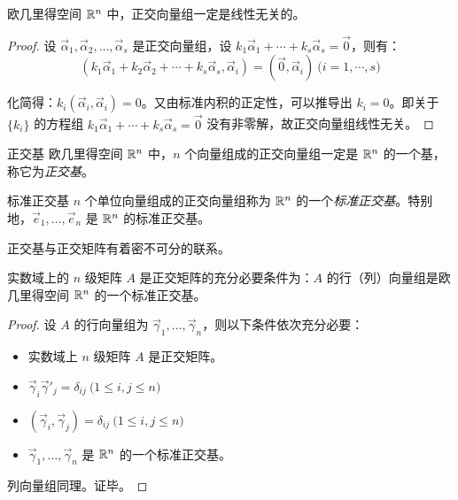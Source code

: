 \begin{theorem}
	欧几里得空间 $\mathbb R^n$ 中，正交向量组一定是线性无关的。
\end{theorem}

\begin{proof}
	设 $\vec \alpha_1, \vec \alpha_2, \ldots, \vec \alpha_s$ 是正交向量组，设 $k_1 \vec \alpha_1 + \cdots + k_s \vec \alpha_s = \vec 0$，则有：
	$$
	(k_1 \vec \alpha_1 + k_2 \vec \alpha_2 + \cdots + k_s \vec \alpha_s, \vec \alpha_i) = (\vec 0, \vec \alpha_i) \pod{i = 1, \cdots, s}
	$$

	化简得：$k_i (\vec \alpha_i, \vec \alpha_i) = 0$。又由标准内积的正定性，可以推导出 $k_i = 0$。即关于 $\{k_i\}$ 的方程组 $k_1 \vec \alpha_1 + \cdots + k_s \vec \alpha_s = \vec 0$ 没有非零解，故正交向量组线性无关。
\end{proof}

\begin{definition}{正交基}
	欧几里得空间 $\mathbb R^n$ 中，$n$ 个向量组成的正交向量组一定是 $\mathbb R^n$ 的一个基，称它为\emph{正交基}。
\end{definition}

\begin{definition}{标准正交基}
	$n$ 个单位向量组成的正交向量组称为 $\mathbb R^n$ 的一个\emph{标准正交基}。特别地，$\vec e_1, \ldots, \vec e_n$ 是 $\mathbb R^n$ 的标准正交基。
\end{definition}

\bigskip

正交基与正交矩阵有着密不可分的联系。

\begin{theorem}
	实数域上的 $n$ 级矩阵 $A$ 是正交矩阵的充分必要条件为：$A$ 的行（列）向量组是欧几里得空间 $\mathbb R^n$ 的一个标准正交基。
\end{theorem}

\begin{proof}
	设 $A$ 的行向量组为 $\vec \gamma_1, \ldots, \vec \gamma_n$，则以下条件依次充分必要：
	\begin{itemize}
		\item 实数域上 $n$ 级矩阵 $A$ 是正交矩阵。
		\item $\vec \gamma_i \vec \gamma'_j = \delta_{ij} \pod{1 \le i, j \le n}$
		\item $(\vec \gamma_i, \vec \gamma_j) = \delta_{ij} \pod{1 \le i, j \le n}$
		\item $\vec \gamma_1, \ldots, \vec \gamma_n$ 是 $\mathbb R^n$ 的一个标准正交基。
	\end{itemize}

	列向量组同理。证毕。
\end{proof}


